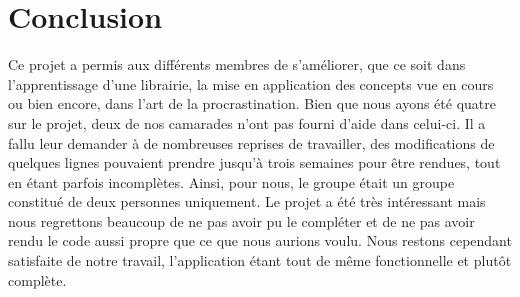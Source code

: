 \chapter{Conclusion}

	Ce projet a permis aux différents membres de s'améliorer, que ce soit dans l'apprentissage d'une librairie, la mise en application des concepts vue en cours ou bien encore, dans l'art de la procrastination. Bien que nous ayons été quatre sur le projet, deux de nos camarades n'ont pas fourni d'aide dans celui-ci. Il a fallu leur demander à de nombreuses reprises de travailler, des modifications de quelques lignes pouvaient prendre jusqu'à trois semaines pour être rendues, tout en étant parfois incomplètes. Ainsi, pour nous, le groupe était un groupe constitué de deux personnes uniquement. Le projet a été très intéressant mais nous regrettons beaucoup de ne pas avoir pu le compléter et de ne pas avoir rendu le code aussi propre que ce que nous aurions voulu. Nous restons cependant satisfaite de notre travail, l'application étant tout de même fonctionnelle et plutôt complète.
